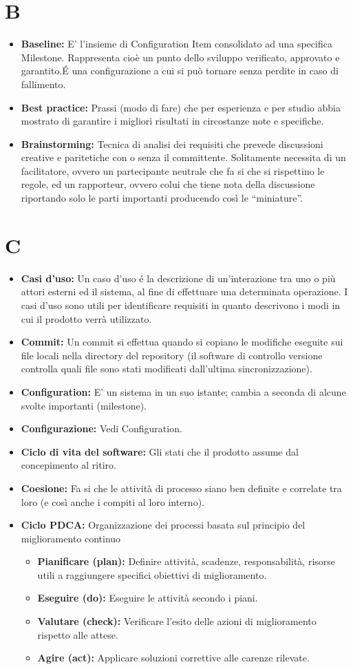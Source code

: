 \documentclass[a4paper]{report}
\newcommand{\mychapter}[2]{
	\setcounter{chapter}{#1}
	\setcounter{section}{0}
	\setcounter{subsection}{1}
	\chapter*{#2}
	\addcontentsline{toc}{chapter}{#2}
}
\begin{document}
	\mychapter{2}{B}
		\begin{itemize}
			\item \textbf{Baseline:} E' l'insieme di Configuration Item consolidato ad una specifica Milestone. Rappresenta 
			cioè un punto dello sviluppo verificato, approvato e garantito.\'E una configurazione a cui si può tornare senza perdite
			 in caso di fallimento.
			\item \textbf{Best practice:} Prassi (modo di fare) che per esperienza e per studio abbia mostrato di 
			garantire i migliori risultati in circostanze note e specifiche. 
			\item \textbf{Brainstorming:} Tecnica di analisi dei requisiti che prevede discussioni creative e paritetiche 
			con o senza il committente. Solitamente necessita di un facilitatore, ovvero un partecipante neutrale che fa 
			si che si rispettino le regole, ed un rapporteur, ovvero colui che tiene nota della discussione riportando solo 
			le parti importanti producendo così le “miniature”.
		\end{itemize}
		
	\mychapter{3}{C}
		\begin{itemize}
			\item \textbf{Casi d'uso:} Un caso d'uso é la descrizione di un'interazione tra uno o più attori esterni ed il sistema, al
			fine di effettuare una determinata operazione. I casi d'uso sono utili per identificare requisiti in quanto descrivono
			i modi in cui il prodotto verrà utilizzato.
			\item \textbf{Commit:} Un commit si effettua quando si copiano le modifiche eseguite sui file locali nella directory del repository  (il software di controllo versione controlla quali file sono stati modificati dall’ultima sincronizzazione).
			\item \textbf{Configuration:} E' un sistema in un suo istante; cambia a seconda di alcune svolte importanti (milestone).
			\item \textbf{Configurazione:} Vedi Configuration.
			\item \textbf{Ciclo di vita del software:} Gli stati che il prodotto assume dal concepimento al ritiro.
			\item \textbf{Coesione:} Fa si che le attività di processo siano ben definite e correlate tra loro (e così anche i 
			compiti al loro interno).
			\item \textbf{Ciclo PDCA:} Organizzazione dei processi basata sul principio del miglioramento continuo
			\begin{itemize}
				\item \textbf{Pianificare (plan):} Definire attività, scadenze, responsabilità, risorse utili a raggiungere 
				specifici obiettivi di miglioramento.
				\item \textbf{Eseguire (do):} Eseguire le attività secondo i piani.
				\item \textbf{Valutare (check):} Verificare l’esito delle azioni di miglioramento rispetto alle attese.
				\item \textbf{Agire (act):} Applicare soluzioni correttive alle carenze rilevate.
			\end{itemize}
		\end{itemize}
		
\end{document}
